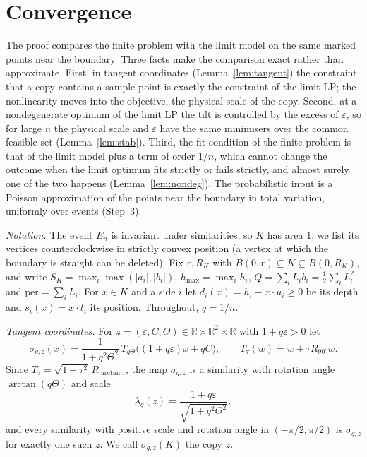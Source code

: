 \documentclass[11pt]{amsart}
\theoremstyle{remark}\newtheorem{remark}[theorem]{Remark}
\newcommand{\R}{\mathbb{R}}
\begin{document}
\section{Convergence}\label{sec:conv}

The proof compares the finite problem with the limit model on the same marked points near the boundary. Three facts
make the comparison exact rather than approximate. First, in tangent coordinates (Lemma~\ref{lem:tangent}) the
constraint that a copy contains a sample point is exactly the constraint of the limit LP; the nonlinearity moves into
the objective, the physical scale of the copy. Second, at a nondegenerate optimum of the limit LP the tilt is
controlled by the excess of $\varepsilon$, so for large $n$ the physical scale and $\varepsilon$ have the same minimisers
over the common feasible set (Lemma~\ref{lem:stab}). Third, the fit condition of the finite problem is that of the limit
model plus a term of order $1/n$, which cannot change the outcome when the limit optimum fits strictly or fails
strictly, and almost surely one of the two happens (Lemma~\ref{lem:nondeg}). The probabilistic input is a Poisson
approximation of the points near the boundary in total variation, uniformly over events (Step~3).

\emph{Notation.} The event $E_n$ is invariant under similarities, so $K$ has area $1$; we list its vertices
counterclockwise in strictly convex position (a vertex at which the boundary is straight can be deleted). Fix
$r,R_K$ with $B(0,r)\subseteq K\subseteq B(0,R_K)$, and write $S_K=\max_i\max(|a_i|,|b_i|)$, $h_{\max}=\max_ih_i$,
$Q=\sum_iL_ib_i=\frac12\sum_iL_i^2$ and $\mathrm{per}=\sum_iL_i$. For $x\in K$ and a side $i$ let $d_i(x)=h_i-x\cdot
u_i\ge0$ be its depth and $s_i(x)=x\cdot t_i$ its position. Throughout, $q=1/n$.

\emph{Tangent coordinates.} For $z=(\varepsilon,C,\Theta)\in\R\times\R^2\times\R$ with $1+q\varepsilon>0$ let
\[
\sigma_{q,z}(x)=\frac{1}{1+q^2\Theta^2}\,T_{q\Theta}\big((1+q\varepsilon)x+qC\big),\qquad T_\tau(w)=w+\tau R_{90^\circ}w .
\]
Since $T_\tau=\sqrt{1+\tau^2}\,R_{\arctan\tau}$, the map $\sigma_{q,z}$ is a similarity with rotation angle
$\arctan(q\Theta)$ and scale
\[
\lambda_q(z)=\frac{1+q\varepsilon}{\sqrt{1+q^2\Theta^2}},
\]
and every similarity with positive scale and rotation angle in $(-\pi/2,\pi/2)$ is $\sigma_{q,z}$ for exactly one such
$z$. We call $\sigma_{q,z}(K)$ the copy $z$.
\end{document}
